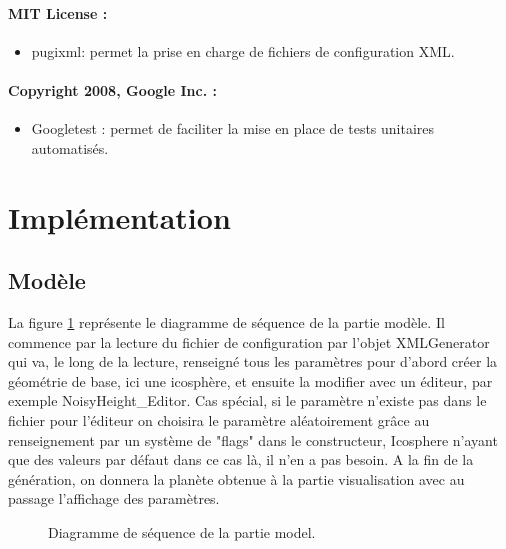 \documentclass[a4paper]{article}
\begin{document}
\paragraph{MIT License :}
\begin{itemize}
\item pugixml:
    permet la prise en charge de fichiers de configuration XML.
\end{itemize}

\paragraph{Copyright 2008, Google Inc. :}
\begin{itemize}
\item Googletest :
    permet de faciliter la mise en place de tests unitaires automatisés.
\end{itemize}

\newpage 
\section{Implémentation}

\subsection{Modèle}

La figure \ref{seqmodel} représente le diagramme de séquence de la partie modèle. 
Il commence par la lecture du fichier de configuration par l'objet XMLGenerator qui va, le long de la lecture, renseigné tous les paramètres pour d'abord créer la géométrie de base, ici une icosphère, et ensuite la modifier avec un éditeur, par exemple NoisyHeight\_Editor. Cas spécial, si le paramètre n'existe pas dans le fichier pour l'éditeur on choisira le paramètre aléatoirement grâce au renseignement par un système de "flags" dans le constructeur, Icosphere n'ayant que des valeurs par défaut dans ce cas là, il n'en a pas besoin. A la fin de la génération, on donnera la planète obtenue à la partie visualisation avec au passage l'affichage des paramètres.\\

\begin{figure}[!ht]
\centering
\caption{Diagramme de séquence de la partie model.}
\label{seqmodel}
\end{figure}
\end{document}
